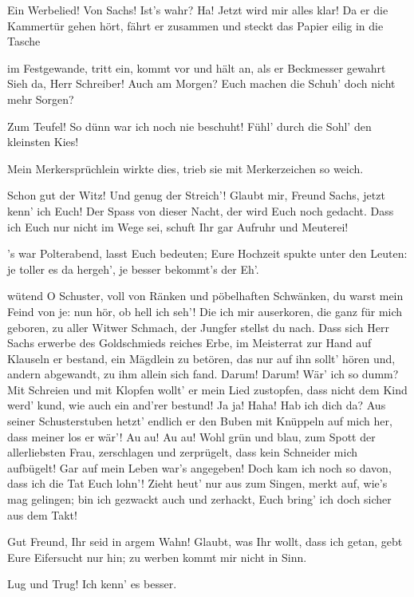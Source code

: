 \begin{drama}
\Beckmesserspeaks
Ein Werbelied! Von Sachs! Ist's wahr?
Ha! Jetzt wird mir alles klar!
Da er die Kammertür gehen hört, fährt er zusammen und steckt das Papier eilig in die Tasche

\Sachsspeaks
im Festgewande, tritt ein, kommt vor und hält an, als er Beckmesser gewahrt
Sieh da, Herr Schreiber! Auch am Morgen?
Euch machen die Schuh' doch nicht mehr Sorgen?

\Beckmesserspeaks
Zum Teufel! So dünn war ich noch nie beschuht!
Fühl' durch die Sohl' den kleinsten Kies!

\Sachsspeaks
Mein Merkersprüchlein wirkte dies,
trieb sie mit Merkerzeichen so weich.

\Beckmesserspeaks
Schon gut der Witz! Und genug der Streich'!
Glaubt mir, Freund Sachs, jetzt kenn' ich Euch!
Der Spass von dieser Nacht, der wird Euch noch gedacht.
Dass ich Euch nur nicht im Wege sei,
schuft Ihr gar Aufruhr und Meuterei!

\Sachsspeaks
's war Polterabend, lasst Euch bedeuten;
Eure Hochzeit spukte unter den Leuten:
je toller es da hergeh', je besser bekommt's der Eh'.

\Beckmesserspeaks
wütend
O Schuster, voll von Ränken
und pöbelhaften Schwänken,
du warst mein Feind von je:
nun hör, ob hell ich seh'!
Die ich mir auserkoren,
die ganz für mich geboren,
zu aller Witwer Schmach,
der Jungfer stellst du nach.
Dass sich Herr Sachs erwerbe
des Goldschmieds reiches Erbe,
im Meisterrat zur Hand
auf Klauseln er bestand,
ein Mägdlein zu betören,
das nur auf ihn sollt' hören
und, andern abgewandt,
zu ihm allein sich fand.
Darum! Darum!
Wär' ich so dumm?
Mit Schreien und mit Klopfen
wollt' er mein Lied zustopfen,
dass nicht dem Kind werd' kund,
wie auch ein and'rer bestund!
Ja ja! Haha! Hab ich dich da?
Aus seiner Schusterstuben
hetzt' endlich er den Buben
mit Knüppeln auf mich her,
dass meiner los er wär'!
Au au! Au au! Wohl grün und blau,
zum Spott der allerliebsten Frau,
zerschlagen und zerprügelt,
dass kein Schneider mich aufbügelt!
Gar auf mein Leben war's angegeben!
Doch kam ich noch so davon,
dass ich die Tat Euch lohn'!
Zieht heut' nur aus zum Singen,
merkt auf, wie's mag gelingen;
bin ich gezwackt auch und zerhackt,
Euch bring' ich doch sicher aus dem Takt!

\Sachsspeaks
Gut Freund, Ihr seid in argem Wahn!
Glaubt, was Ihr wollt, dass ich getan,
gebt Eure Eifersucht nur hin;
zu werben kommt mir nicht in Sinn.

\Beckmesserspeaks
Lug und Trug! Ich kenn' es besser.


\end{drama}
